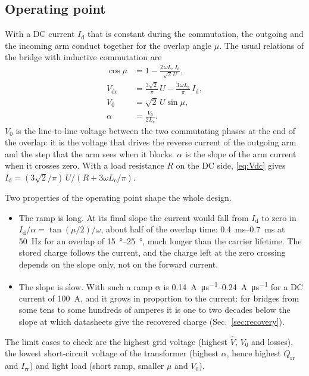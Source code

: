 \documentclass[10pt,a4paper]{scrartcl}
\newcommand{\Qrr}{Q_\mathrm{rr}}
\newcommand{\Irr}{I_\mathrm{rr}}
\newcommand{\Lc}{L_\mathrm{c}}
\newcommand{\Id}{I_\mathrm{d}}
\newcommand{\Vdc}{V_\mathrm{dc}}
\newcommand{\Vo}{V_0}
\newcommand{\Vh}{\hat V}
\begin{document}
\subsection{Operating point}
With a DC current $\Id$ that is constant during the commutation, the outgoing and the incoming arm conduct together for the overlap angle $\mu$. The usual relations of the bridge with inductive commutation \cite{mohan} are
\begin{align}
\cos\mu &= 1 - \frac{2\,\omega\Lc\,\Id}{\sqrt2\,U}, \label{eq:mu}\\
\Vdc &= \frac{3\sqrt2}{\pi}\,U - \frac{3\,\omega\Lc}{\pi}\,\Id, \label{eq:Vdc}\\
\Vo &= \sqrt2\,U \sin\mu, \label{eq:V0}\\
\alpha &= \frac{\Vo}{2\Lc} . \label{eq:alpha}
\end{align}
$\Vo$ is the line-to-line voltage between the two commutating phases at the end of the overlap: it is the voltage that drives the reverse current of the outgoing arm and the step that the arm sees when it blocks. $\alpha$ is the slope of the arm current when it crosses zero. With a load resistance $R$ on the DC side, \eqref{eq:Vdc} gives $\Id = (3\sqrt2/\pi)\,U/(R + 3\omega\Lc/\pi)$.

Two properties of the operating point shape the whole design.
\begin{itemize}
\item The ramp is long. At its final slope the current would fall from $\Id$ to zero in $\Id/\alpha = \tan(\mu/2)/\omega$, about half of the overlap time: \SIrange{0.4}{0.7}{\milli\second} at \SI{50}{\hertz} for an overlap of \SIrange{15}{25}{\degree}, much longer than the carrier lifetime. The stored charge follows the current, and the charge left at the zero crossing depends on the slope only, not on the forward current.
\item The slope is slow. With such a ramp $\alpha$ is \SIrange{0.14}{0.24}{\ampere\per\micro\second} for a DC current of \SI{100}{\ampere}, and it grows in proportion to the current: for bridges from some tens to some hundreds of amperes it is one to two decades below the slope at which datasheets give the recovered charge (Sec.~\ref{sec:recovery}).
\end{itemize}
The limit cases to check are the highest grid voltage (highest $\Vh$, $\Vo$ and losses), the lowest short-circuit voltage of the transformer (highest $\alpha$, hence highest $\Qrr$ and $\Irr$) and light load (short ramp, smaller $\mu$ and $\Vo$).
\end{document}
